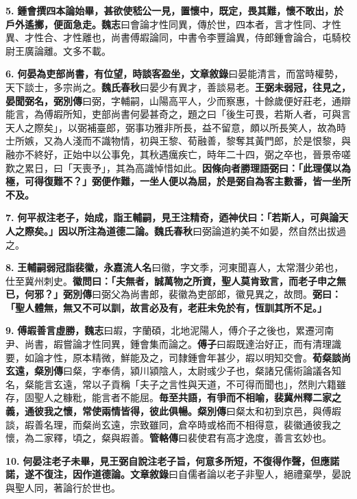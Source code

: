 \textbf{5.} \textbf{鍾會撰四本論始畢，甚欲使嵇公一見，置懷中，既定，畏其難，懷不敢出，於戶外遙擲，便面急走。}{\footnotesize \textbf{魏志}曰會論才性同異，傳於世，四本者，言才性同、才性異、才性合、才性離也，尚書傅嘏論同，中書令李豐論異，侍郎鍾會論合，屯騎校尉王廣論離。文多不載。}

\textbf{6.} \textbf{何晏為吏部尚書，有位望，時談客盈坐，}{\footnotesize \textbf{文章敘錄}曰晏能清言，而當時權勢，天下談士，多宗尚之。\textbf{魏氏春秋}曰晏少有異才，善談易老。}\textbf{王弼未弱冠，往見之，晏聞弼名，}{\footnotesize \textbf{弼別傳}曰弼，字輔嗣，山陽高平人，少而察惠，十餘歲便好莊老，通辯能言，為傅嘏所知，吏部尚書何晏甚奇之，題之曰「後生可畏，若斯人者，可與言天人之際矣」，以弼補臺郎，弼事功雅非所長，益不留意，頗以所長笑人，故為時士所嫉，又為人淺而不識物情，初與王黎、荀融善，黎奪其黃門郎，於是恨黎，與融亦不終好，正始中以公事免，其秋遇癘疾亡，時年二十四，弼之卒也，晉景帝嗟歎之累日，曰「天喪予」，其為高識悼惜如此。}\textbf{因條向者勝理語弼曰：「此理僕以為極，可得復難不？」弼便作難，一坐人便以為屈，於是弼自為客主數番，皆一坐所不及。}

\textbf{7.} \textbf{何平叔注老子，始成，詣王輔嗣，見王注精奇，迺神伏曰：「若斯人，可與論天人之際矣。」因以所注為道德二論。}{\footnotesize \textbf{魏氏春秋}曰弼論道約美不如晏，然自然出拔過之。}

\textbf{8.} \textbf{王輔嗣弱冠詣裴徽，}{\footnotesize \textbf{永嘉流人名}曰徽，字文季，河東聞喜人，太常潛少弟也，仕至冀州刺史。}\textbf{徽問曰：「夫無者，誠萬物之所資，聖人莫肯致言，而老子申之無已，何邪？」}{\footnotesize \textbf{弼別傳}曰弼父為尚書郎，裴徽為吏部郎，徽見異之，故問。}\textbf{弼曰：「聖人體無，無又不可以訓，故言必及有，老莊未免於有，恆訓其所不足。」}

\textbf{9.} \textbf{傅嘏善言虛勝，}{\footnotesize \textbf{魏志}曰嘏，字蘭碩，北地泥陽人，傅介子之後也，累遷河南尹、尚書，嘏嘗論才性同異，鍾會集而論之。\textbf{傅子}曰嘏既達治好正，而有清理識要，如論才性，原本精微，鮮能及之，司隸鍾會年甚少，嘏以明知交會。}\textbf{荀粲談尚玄遠，}{\footnotesize \textbf{粲別傳}曰粲，字奉倩，潁川潁陰人，太尉彧少子也，粲諸兄儒術論議各知名，粲能言玄遠，常以子貢稱「夫子之言性與天道，不可得而聞也」，然則六籍雖存，固聖人之糠粃，能言者不能屈。}\textbf{毎至共語，有爭而不相喻，裴冀州釋二家之義，通彼我之懷，常使兩情皆得，彼此俱暢。}{\footnotesize \textbf{粲別傳}曰粲太和初到京邑，與傅嘏談，嘏善名理，而粲尚玄遠，宗致雖同，倉卒時或格而不相得意，裴徽通彼我之懷，為二家釋，頃之，粲與嘏善。\textbf{管輅傳}曰裴使君有高才逸度，善言玄妙也。}

\textbf{10.} \textbf{何晏注老子未畢，見王弼自說注老子旨，何意多所短，不復得作聲，但應諾諾，遂不復注，因作道德論。}{\footnotesize \textbf{文章敘錄}曰自儒者論以老子非聖人，絕禮棄學，晏說與聖人同，著論行於世也。}

